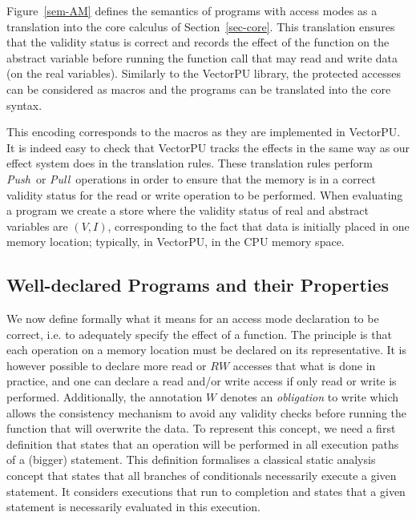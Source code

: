 \documentclass[preprint,12pt]{elsarticle}
\newcommand{\symb}[1]{\textit{#1}}
\newcommand{\Push}{\symb{Push}}
\newcommand{\Pull}{\symb{Pull}}
\begin{document}
Figure~\ref{sem-AM} defines the semantics of programs with access modes as a translation 
into the core calculus of Section~\ref{sec-core}. 
This translation
ensures that the validity status is correct and records the effect of the function on the 
abstract variable before running the function call that may 
read and write data (on the real variables).  Similarly to the VectorPU library, the 
protected accesses can be 
considered as macros and the programs can be translated into the 
core syntax.

This encoding corresponds  to the macros as they are implemented in VectorPU.  
It is indeed easy 
to check that VectorPU tracks the effects in 
the same way as our effect system  does in the translation rules. These translation 
rules  perform \Push\ or 
\Pull\ operations in order to ensure that the memory is in a correct validity status for 
the read or write operation to be performed.
When evaluating a program we create a store where the validity status of real and 
abstract variables are $(V,I)$, corresponding to the fact that data is 
initially placed in one memory location; typically, in VectorPU, in the CPU memory space.
%
%


\subsection{Well-declared Programs and their Properties}
We now define formally what it means for an access mode declaration to be correct, i.e. 
to adequately specify the effect of a function. The principle is that each operation on a 
memory location must be declared on its representative. It is however possible to declare 
more read or $RW$ accesses that what is done in practice, and one can declare a read 
and/or write 
access if only read or write is performed. Additionally, the annotation $W$ denotes an 
\emph{obligation} to write which allows the consistency mechanism to avoid any validity 
checks before running the function that will overwrite the data. 
To represent this concept, we need a first definition that states that an operation will be performed in all execution paths of a (bigger) statement. This 
definition 
formalises a classical static analysis concept that states that all branches of 
conditionals necessarily execute a given statement. It considers executions that run to 
completion and states that a given statement is necessarily evaluated in this execution.
\end{document}
